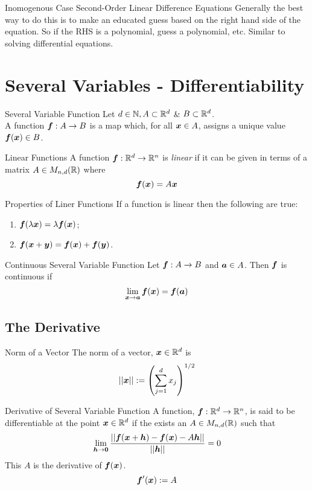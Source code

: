\documentclass[11pt,a4paper]{article}
\begin{document}
\subtitle{Remark 8.10 - }{Inomogenous Case Second-Order Linear Difference Equations}
Generally the best way to do this is to make an educated guess based on the right hand side of the equation.
So if the RHS is a polynomial, guess a polynomial, etc. Similar to solving differential equations.

\section{Several Variables - Differentiability}
%
\subtitle{Definition 9.1 - }{Several Variable Function}
Let $d \in \mathbb{N}, A \subset \mathbb{R}^d$ \& $B \subset \mathbb{R}^d$.\\
A function $\boldsymbol{f} : A \to B$ is a map which, for all $\boldsymbol{x} \in A$, assigns a unique value $\boldsymbol{f}(\boldsymbol{x}) \in B$.\\

\subtitle{Defintion 9.2 - }{Linear Functions}
A function $\boldsymbol{f} : \mathbb{R}^d \to \mathbb{R}^n$ is \textit{linear} if it can be given in terms of a matrix $A \in M_{n,d}(\mathbb{R})$ where $$\boldsymbol{f}(\boldsymbol{x}) = A\boldsymbol{x}$$

\subtitle{Theorem 9.3 - }{Properties of Liner Functions}
If a function is linear then the following are true:
\begin{enumerate}[label=\roman*)]
  \item $\boldsymbol{f}(\lambda\boldsymbol{x}) = \lambda\boldsymbol{f}(\boldsymbol{x})$;
  \item $\boldsymbol{f}(\boldsymbol{x} + \boldsymbol{y}) = \boldsymbol{f}(\boldsymbol{x}) + \boldsymbol{f}(\boldsymbol{y})$.
\end{enumerate}

\subtitle{Definition 9.4 - }{Continuous Several Variable Function}
Let $\boldsymbol{f} : A \to B$ and $\boldsymbol{a} \in A$. Then $\boldsymbol{f}$ is continuous if $$\lim_{\boldsymbol{x} \to \boldsymbol{a}}\boldsymbol{f}(\boldsymbol{x}) = \boldsymbol{f}(\boldsymbol{a})$$

\subsection{The Derivative}
%
\subtitle{Defintion 9.5 - }{Norm of a Vector}
The norm of a vector, $\boldsymbol{x} \in \mathbb{R}^d$ is $$||\boldsymbol{x}|| := \left( \sum_{j=1}^{d}x_j \right)^{1/2}$$

\subtitle{Definition 9.6 - }{Derivative of Several Variable Function}
A function, $\boldsymbol{f} : \mathbb{R}^d \to \mathbb{R}^n$, is said to be differentiable at the point $\boldsymbol{x} \in \mathbb{R}^d$ if the exists an $A \in M_{n,d}(\mathbb{R})$ such that
$$\lim_{\boldsymbol{h} \to \boldsymbol{0}} \frac{||\boldsymbol{f}(\boldsymbol{x} + \boldsymbol{h}) - \boldsymbol{f}(\boldsymbol{x}) -A\boldsymbol{h}||}{||\boldsymbol{h}||} = 0$$
This $A$ is the derivative of $\boldsymbol{f}(\boldsymbol{x})$. $$\boldsymbol{f}'(\boldsymbol{x}) := A$$
\end{document}
